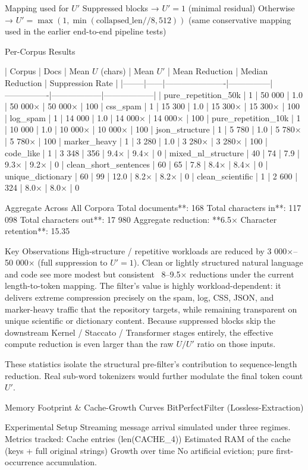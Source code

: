 Mapping used for \( U' \)
Suppressed blocks → \( U' = 1 \) (minimal residual)
Otherwise → \( U' = \max(1, \min(\text{collapsed_len} // 8, 512)) \)  
  (same conservative mapping used in the earlier end-to-end pipeline tests)

Per-Corpus Results

| Corpus | Docs | Mean \( U \) (chars) | Mean \( U' \) | Mean Reduction | Median Reduction | Suppression Rate |
|--------|------|----------------------|---------------|----------------|------------------|------------------|
| pure_repetition_50k | 1 | 50 000 | 1.0 | 50 000× | 50 000× | 100 %
| css_spam | 1 | 15 300 | 1.0 | 15 300× | 15 300× | 100 %
| log_spam | 1 | 14 000 | 1.0 | 14 000× | 14 000× | 100 %
| pure_repetition_10k | 1 | 10 000 | 1.0 | 10 000× | 10 000× | 100 %
| json_structure | 1 | 5 780 | 1.0 | 5 780× | 5 780× | 100 %
| marker_heavy | 1 | 3 280 | 1.0 | 3 280× | 3 280× | 100 %
| code_like | 1 | 3 348 | 356 | 9.4× | 9.4× | 0 %
| mixed_nl_structure | 40 | 74 | 7.9 | 9.3× | 9.2× | 0 %
| clean_short_sentences | 60 | 65 | 7.8 | 8.4× | 8.4× | 0 %
| unique_dictionary | 60 | 99 | 12.0 | 8.2× | 8.2× | 0 %
| clean_scientific | 1 | 2 600 | 324 | 8.0× | 8.0× | 0 %

Aggregate Across All Corpora
Total documents**: 168  
Total characters in**: 117 098  
Total characters out**: 17 980  
Aggregate reduction: **6.5×  
Character retention**: 15.35 %

Key Observations
High-structure / repetitive workloads are reduced by 3 000×–50 000× (full suppression to \( U' = 1 \)).
Clean or lightly structured natural language and code see more modest but consistent ~8–9.5× reductions under the current length-to-token mapping.
The filter’s value is highly workload-dependent: it delivers extreme compression precisely on the spam, log, CSS, JSON, and marker-heavy traffic that the repository targets, while remaining transparent on unique scientific or dictionary content.
Because suppressed blocks skip the downstream Kernel / Staccato / Transformer stages entirely, the effective compute reduction is even larger than the raw \( U / U' \) ratio on those inputs.

These statistics isolate the structural pre-filter’s contribution to sequence-length reduction. Real sub-word tokenizers would further modulate the final token count \( U' \).

Memory Footprint & Cache-Growth Curves  
BitPerfectFilter (Lossless-Extraction)

Experimental Setup
Streaming message arrival simulated under three regimes.
Metrics tracked:
  Cache entries (len(CACHE_4))
  Estimated RAM of the cache (keys + full original strings)
  Growth over time
No artificial eviction; pure first-occurrence accumulation.

